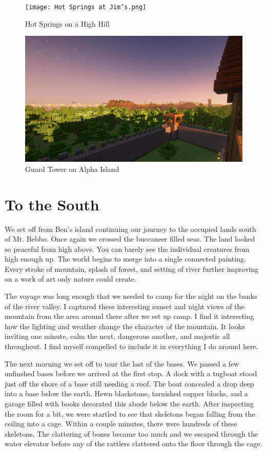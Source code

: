 \begin{figure}[H]
	\centering
	\texttt{[image: Hot Springs at Jim's.png]}
	\caption{Hot Springs on a High Hill}
\end{figure}

\begin{figure}[H]
	\centering
	\includegraphics[width=\linewidth]{Guard Tower on Alpha Island.png}
	\caption{Guard Tower on Alpha Island}
\end{figure}
\newpage
\section{To the South}

We set off from Ben's island continuing our journey to the occupied lands south of Mt. Bebbo. Once again we crossed the buccaneer filled seas. The land looked so peaceful from high above. You can barely see the individual creatures from high enough up. The world begins to merge into a single connected painting. Every stroke of mountain, splash of forest, and setting of river further improving on a work of art only nature could create.

The voyage was long enough that we needed to camp for the night on the banks of the river valley. I captured these interesting sunset and night views of the mountain from the area around there after we set up camp. I find it interesting how the lighting and weather change the character of the mountain. It looks inviting one minute, calm the next, dangerous another, and majestic all throughout. I find myself compelled to include it in everything I do around here.

The next morning we set off to tour the last of the bases. We passed a few unfinshed bases before we arrived at the first stop. A dock with a tugboat stood just off the shore of a base still needing a roof. The boat concealed a drop deep into a base below the earth. Hewn blackstone, tarnished copper blocks, and a garage filled with books decorated this abode below the earth. After inspecting the room for a bit, we were startled to see that skeletons began falling from the ceiling into a cage. Within a couple minutes, there were hundreds of these skeletons. The clattering of bones became too much and we escaped through the water elevator before any of the rattlers clattered onto the floor through the cage.

